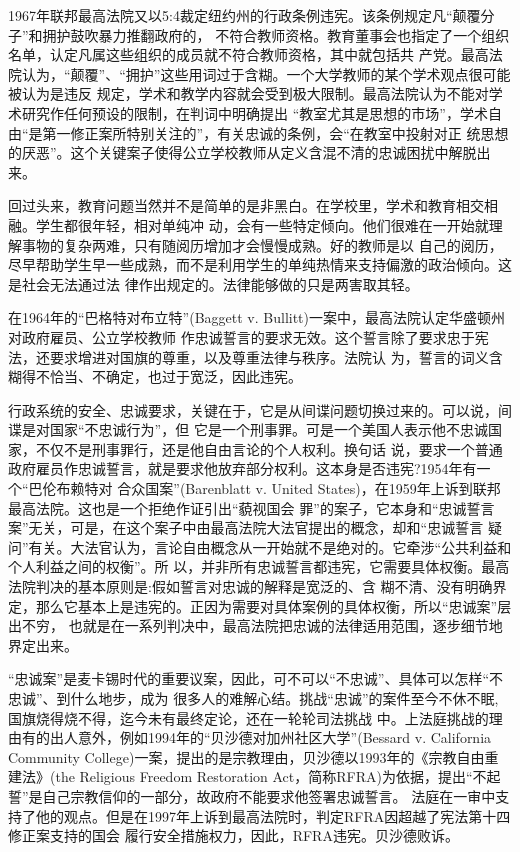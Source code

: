 \documentclass[10pt]{article}
\begin{document}
{1967年联邦最高法院又以5:4裁定纽约州的行政条例违宪。该条例规定凡``颠覆分子''和拥护鼓吹暴力推翻政府的，
不符合教师资格。教育董事会也指定了一个组织名单，认定凡属这些组织的成员就不符合教师资格，其中就包括共
产党。最高法院认为，``颠覆''、``拥护''这些用词过于含糊。一个大学教师的某个学术观点很可能被认为是违反
规定，学术和教学内容就会受到极大限制。最高法院认为不能对学术研究作任何预设的限制，在判词中明确提出
``教室尤其是思想的市场''，学术自由``是第一修正案所特别关注的''，有关忠诚的条例，会``在教室中投射对正
统思想的厌恶''。这个关键案子使得公立学校教师从定义含混不清的忠诚困扰中解脱出来。

回过头来，教育问题当然并不是简单的是非黑白。在学校里，学术和教育相交相融。学生都很年轻，相对单纯冲
动，会有一些特定倾向。他们很难在一开始就理解事物的复杂两难，只有随阅历增加才会慢慢成熟。好的教师是以
自己的阅历，尽早帮助学生早一些成熟，而不是利用学生的单纯热情来支持偏激的政治倾向。这是社会无法通过法
律作出规定的。法律能够做的只是两害取其轻。

在1964年的``巴格特对布立特''(Baggett v. Bullitt)一案中，最高法院认定华盛顿州对政府雇员、公立学校教师
作忠诚誓言的要求无效。这个誓言除了要求忠于宪法，还要求增进对国旗的尊重，以及尊重法律与秩序。法院认
为，誓言的词义含糊得不恰当、不确定，也过于宽泛，因此违宪。

行政系统的安全、忠诚要求，关键在于，它是从间谍问题切换过来的。可以说，间谍是对国家``不忠诚行为''，但
它是一个刑事罪。可是一个美国人表示他不忠诚国家，不仅不是刑事罪行，还是他自由言论的个人权利。换句话
说，要求一个普通政府雇员作忠诚誓言，就是要求他放弃部分权利。这本身是否违宪?1954年有一个``巴伦布赖特对
合众国案''(Barenblatt v. United States)，在1959年上诉到联邦最高法院。这也是一个拒绝作证引出``藐视国会
罪''的案子，它本身和``忠诚誓言案''无关，可是，在这个案子中由最高法院大法官提出的概念，却和``忠诚誓言
疑问''有关。大法官认为，言论自由概念从一开始就不是绝对的。它牵涉``公共利益和个人利益之间的权衡''。所
以，并非所有忠诚誓言都违宪，它需要具体权衡。最高法院判决的基本原则是:假如誓言对忠诚的解释是宽泛的、含
糊不清、没有明确界定，那么它基本上是违宪的。正因为需要对具体案例的具体权衡，所以``忠诚案''层出不穷，
也就是在一系列判决中，最高法院把忠诚的法律适用范围，逐步细节地界定出来。

``忠诚案''是麦卡锡时代的重要议案，因此，可不可以``不忠诚''、具体可以怎样``不忠诚''、到什么地步，成为
很多人的难解心结。挑战``忠诚''的案件至今不休不眠,国旗烧得烧不得，迄今未有最终定论，还在一轮轮司法挑战
中。上法庭挑战的理由有的出人意外，例如1994年的``贝沙德对加州社区大学''(Bessard v. California
Community College)一案，提出的是宗教理由，贝沙德以1993年的《宗教自由重建法》(the Religious Freedom
Restoration Act，简称RFRA)为依据，提出``不起誓''是自己宗教信仰的一部分，故政府不能要求他签署忠诚誓言。
法庭在一审中支持了他的观点。但是在1997年上诉到最高法院时，判定RFRA因超越了宪法第十四修正案支持的国会
履行安全措施权力，因此，RFRA违宪。贝沙德败诉。

}
\end{document}
